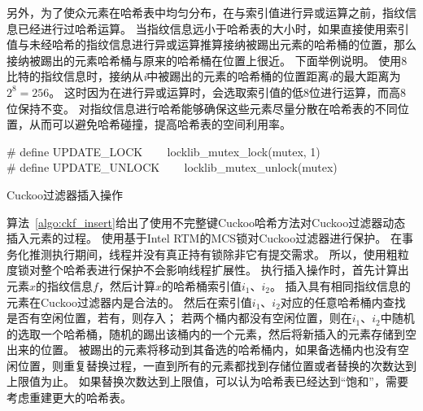 另外，为了使众元素在哈希表中均匀分布，在与索引值进行异或运算之前，指纹信息已经进行过哈希运算。
当指纹信息远小于哈希表的大小时，如果直接使用索引值与未经哈希的指纹信息进行异或运算推算接纳被踢出元素的哈希桶的位置，那么接纳被踢出的元素哈希桶与原来的哈希桶在位置上很近。
下面举例说明。
使用8比特的指纹信息时，接纳从\textit{i}中被踢出的元素的哈希桶的位置距离\textit{i}的最大距离为$2^8 = 256$。
这时因为在进行异或运算时，会选取索引值的低8位进行运算，而高8位保持不变。
对指纹信息进行哈希能够确保这些元素尽量分散在哈希表的不同位置，从而可以避免哈希碰撞，提高哈希表的空间利用率。
\begin{algorithm}[htbp]
\SetAlgoLined
\# define UPDATE\_LOCK ~~~ locklib\_mutex\_lock(mutex, 1)\\
\# define UPDATE\_UNLOCK ~~~ locklib\_mutex\_unlock(mutex)\\
\caption{Cuckoo过滤器插入操作}
\label{algo:ckf_insert}
\end{algorithm}
算法~\ref{algo:ckf_insert}给出了使用不完整键Cuckoo哈希方法对Cuckoo过滤器动态插入元素的过程。
使用基于Intel RTM的MCS锁对Cuckoo过滤器进行保护。
在事务化推测执行期间，线程并没有真正持有锁除非它有提交需求。
所以，使用粗粒度锁对整个哈希表进行保护不会影响线程扩展性。
执行插入操作时，首先计算出元素$x$的指纹信息$f$，然后计算$x$的哈希桶索引值$i_1$、$i_2$。
插入具有相同指纹信息的元素在Cuckoo过滤器内是合法的。
然后在索引值$i_1$、$i_2$对应的任意哈希桶内查找是否有空闲位置，若有，则存入；
若两个桶内都没有空闲位置，则在$i_1$、$i_2$中随机的选取一个哈希桶，随机的踢出该桶内的一个元素，然后将新插入的元素存储到空出来的位置。
被踢出的元素将移动到其备选的哈希桶内，如果备选桶内也没有空闲位置，则重复替换过程，一直到所有的元素都找到存储位置或者替换的次数达到上限值为止。
如果替换次数达到上限值，可以认为哈希表已经达到“饱和”，需要考虑重建更大的哈希表。

